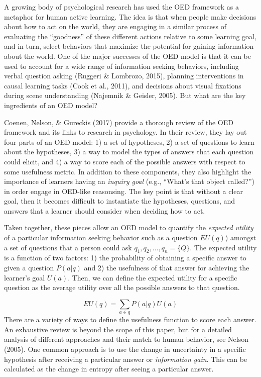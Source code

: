 \documentclass[a4paper,man,apacite,floatsintext]{apa6}
\begin{document}
A growing body of psychological research has used the OED framework as a
metaphor for human active learning. The idea is that when people make
decisions about how to act on the world, they are engaging in a similar
process of evaluating the ``goodness'' of these different actions
relative to some learning goal, and in turn, select behaviors that
maximize the potential for gaining information about the world. One of
the major successes of the OED model is that it can be used to account
for a wide range of information seeking behaviors, including verbal
question asking (Ruggeri \& Lombrozo, 2015), planning interventions in
causal learning tasks (Cook et al., 2011), and decisions about visual
fixations during scene understanding (Najemnik \& Geisler, 2005). But
what are the key ingredients of an OED model?

Coenen, Nelson, \& Gureckis (2017) provide a thorough review of the OED
framework and its links to research in psychology. In their review, they
lay out four parts of an OED model: 1) a set of hypotheses, 2) a set of
questions to learn about the hypotheses, 3) a way to model the types of
answers that each question could elicit, and 4) a way to score each of
the possible answers with respect to some usefulness metric. In addition
to these components, they also highlight the importance of learners
having an \emph{inquiry goal} (e.g., ``What's that object called?'') in
order engage in OED-like reasonsing. The key point is that without a
clear goal, then it becomes difficult to instantiate the hypotheses,
questions, and answers that a learner should consider when deciding how
to act.

Taken together, these pieces allow an OED model to quantify the
\emph{expected utility} of a particular information seeking behavior
such as a question \(EU(q)\)) amongst a set of questions that a person
could ask \(q_1, q_2,..., q_n = \{Q\}\). The expected utility is a
function of two factors: 1) the probability of obtaining a specific
answer to given a question \(P(a|q)\) and 2) the usefulness of that
answer for achieving the learner's goal \(U(a)\). Then, we can define
the expected utility for a specific question as the average utility over
all the possible answers to that question.

\[EU(q) = \sum_{a\in q}{P(a|q)U(a)}\] There are a variety of ways to
define the usefulness function to score each answer. An exhaustive
review is beyond the scope of this paper, but for a detailed analysis of
different approaches and their match to human behavior, see Nelson
(2005). One common approach is to use the change in uncertainty in a
specific hypothesis after receiving a particular answer or
\emph{information gain}. This can be calculated as the change in entropy
after seeing a particular answer.
\end{document}
